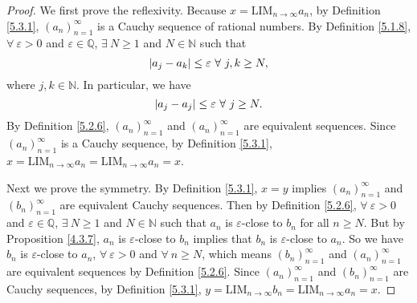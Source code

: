 \begin{proof}
We first prove the reflexivity.
Because \(x = \text{LIM}_{n \to \infty} a_n\), by Definition \ref{5.3.1}, \((a_n)_{n = 1}^{\infty}\) is a Cauchy sequence of rational numbers.
By Definition \ref{5.1.8}, \(\forall\ \varepsilon > 0\) and \(\varepsilon \in \mathds{Q}\), \(\exists\ N \geq 1\) and \(N \in \mathds{N}\) such that
\[
    \abs*{a_j - a_k} \leq \varepsilon \ \forall\ j, k \geq N,
\]
where \(j, k \in \mathds{N}\).
In particular, we have
\[
    \abs*{a_j - a_j} \leq \varepsilon \ \forall\ j \geq N.
\]
By Definition \ref{5.2.6}, \((a_n)_{n = 1}^{\infty}\) and \((a_n)_{n = 1}^{\infty}\) are equivalent sequences.
Since \((a_n)_{n = 1}^{\infty}\) is a Cauchy sequence, by Definition \ref{5.3.1}, \(x = \text{LIM}_{n \to \infty} a_n = \text{LIM}_{n \to \infty} a_n = x\).

Next we prove the symmetry.
By Definition \ref{5.3.1}, \(x = y\) implies \((a_n)_{n = 1}^{\infty}\) and \((b_n)_{n = 1}^{\infty}\) are equivalent Cauchy sequences.
Then by Definition \ref{5.2.6}, \(\forall\ \varepsilon > 0\) and \(\varepsilon \in \mathds{Q}\), \(\exists\ N \geq 1\) and \(N \in \mathds{N}\) such that \(a_n\) is \(\varepsilon\)-close to \(b_n\) for all \(n \geq N\).
But by Proposition \ref{4.3.7}, \(a_n\) is \(\varepsilon\)-close to \(b_n\) implies that \(b_n\) is \(\varepsilon\)-close to \(a_n\).
So we have \(b_n\) is \(\varepsilon\)-close to \(a_n\), \(\forall\ \varepsilon > 0\) and \(\forall\ n \geq N\), which means \((b_n)_{n = 1}^{\infty}\) and \((a_n)_{n = 1}^{\infty}\) are equivalent sequences by Definition \ref{5.2.6}.
Since \((a_n)_{n = 1}^{\infty}\) and \((b_n)_{n = 1}^{\infty}\) are Cauchy sequences, by Definition \ref{5.3.1}, \(y = \text{LIM}_{n \to \infty} b_n = \text{LIM}_{n \to \infty} a_n = x\).


\end{proof}
